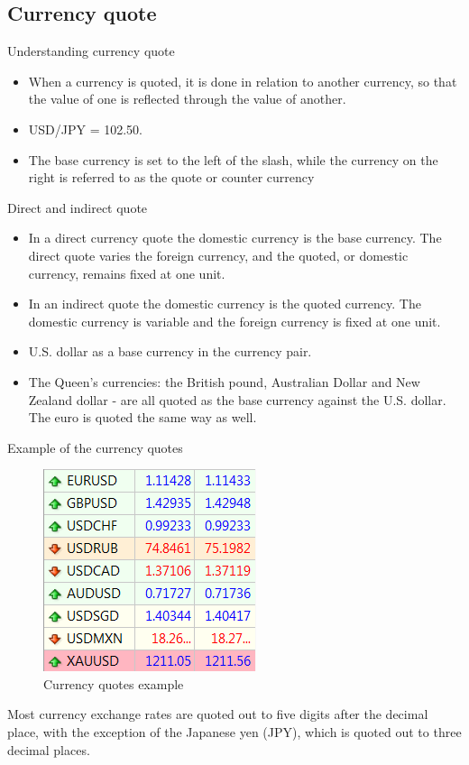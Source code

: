 \documentclass[international_finance_p1.tex]{subfiles}
\begin{document}
\subsection{Currency quote}
\begin{frame}{Understanding currency quote}
\begin{itemize}[<+->]
\item
When a currency is quoted, it is done in relation to another currency, so that the value of one is reflected through the value of another. 
\item
 USD/JPY = 102.50.
\item
The base currency is set to the left of the slash, while the currency on the right is referred to as the quote or counter currency
\end{itemize}
\end{frame}
\begin{frame}{Direct and indirect quote}
\begin{itemize}[<+->]
\item
In a direct currency quote the domestic currency is the base currency. The direct quote varies the foreign currency, and the quoted, or domestic currency, remains fixed at one unit.
\item
In an indirect quote the domestic currency is the quoted currency. The domestic currency is variable and the foreign currency is fixed at one unit.
\end{itemize}
\end{frame}
\begin{frame}{}
\begin{itemize}[<+->]
\item
U.S. dollar as a base currency in the currency pair.
\item
The Queen's currencies: the British pound, Australian Dollar and New Zealand dollar - are all quoted as the base currency against the U.S. dollar. The euro is quoted the same way as well.
\end{itemize}
\end{frame}
\begin{frame}{Example of the currency quotes}
\begin{figure}
\centering
\includegraphics[scale=0.7]{img/currency_quotes}
\caption{Currency quotes example}
\end{figure}
Most currency exchange rates are quoted out to five digits after the decimal place, with the exception of the Japanese yen (JPY), which is quoted out to three decimal places.
\end{frame}
\end{document}
